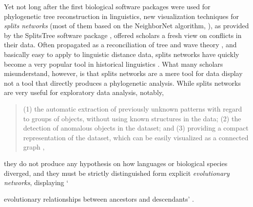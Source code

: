 \documentclass[svgnames,12pt]{scrartcl}
\begin{document}
{Yet not long after the first biological software packages were used for phylogenetic tree
reconstruction in linguistics, new
visualization techniques for \emph{splits networks} (most of them based on the NeighborNet algorithm,
\citealt{Bryant2004}), as provided by the SplitsTree software package \citep{Huson1998}, offered
scholars a fresh view on conflicts in their data. Often propagated as a reconciliation of
tree and wave theory \citep{Hamed2006,McMahon2005}, and basically easy to apply to
linguistic distance data, splits networks have quickly become a very popular tool in historical
linguistics \citep{Heggarty2010,Hamed2005,Bowern2010}. What many scholars misunderstand, however, is
that splits networks are a mere tool for data display \citep{Morrison2010} not a tool that directly
produces a phylogenetic analysis. While splits
networks are very useful for exploratory data analysis, notably, 
\begin{quote}
(1) the automatic extraction of previously unknown patterns with regard to groups of
objects, without using known structures in the data;
(2) the detection of anomalous objects in the dataset;
and (3) providing a compact representation of the
dataset, which can be easily visualized as a connected
graph \citep[2]{Morrison2014b},
\end{quote}
they do not produce any hypothesis on how languages or biological species diverged, and they must be
strictly distinguished form explicit \emph{evolutionary networks}, displaying `{evolutionary
relationships between ancestors and descendants' \citep[43]{Morrison2011}.
 
}}
\end{document}
